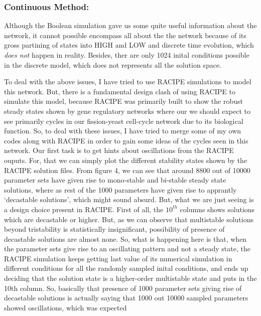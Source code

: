 \documentclass{article}
\begin{document}
\subsubsection*{Continuous Method:} 
Although the Boolean simulation gave us some quite useful information about
the network, it cannot possible encompass all about the the network because 
of its gross partining of states into HIGH and LOW and discrete time evolution,
which \textit{does not} happen in reality. Besides, ther are only 1024 inital 
conditions possible in the discrete model, which does not represents all the 
solution space.

To deal with the above issues, I have tried to use RACIPE simulations to model 
this network. But, there is a fundamental design clash of using RACIPE to 
simulate this model, because RACIPE was primarily built to show the robust 
steady states shown by gene regulatory networks where our we should expect to 
see primarily cycles in our fission-yeast cell-cycle network due to its 
biological function. So, to deal with these issues, I have tried to merge some 
of my own codes along with RACIPE in order to gain some ideas of the cycles 
seen in this network. 
\newline \newline 
Our first task is to get hints about oscillations from the RACIPE ouputs. For,
that we can simply plot the different stability states shown by the RACIPE 
solution files. From figure 4, we can see that around 8800 out of 10000 parameter
sets have given rise to mono-stable and bi-stable steady state solutions, where 
as rest of the 1000 parameters have given rise to apprantly `decastable solutions', 
which might sound absurd. But, what we are just seeing is a design choice present 
in RACIPE. First of all, the $10^{th}$ columns shows solutions which are decastable 
or higher. But, as we can observe that multistable solutions beyond tristability is 
statistically insignificant, possibility of presence of decastable solutions are 
almost none. So, what is happening here is that, when the parameter sets give rise 
to an oscillating pattern and not a steady state, the RACIPE simulation keeps getting 
last value of its numerical simulation in different conditions for all the 
randomly sampled inital conditions, and ends up deciding that the solution state 
is a higher-order multistable state and puts in the 10th column. So, basically that 
presence of 1000 parameter sets giving rise of decastable solutions is actually saying 
that 1000 out 10000 sampled parameters showed oscillations, which was expected 
\end{document}
